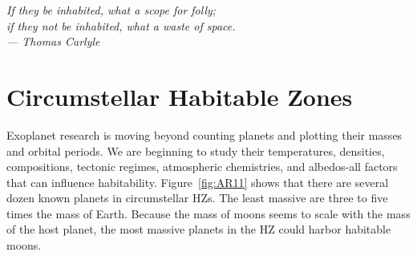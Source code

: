 \clearpage

\begin{flushright}
	\textit{If they be inhabited, what a scope for folly;\\if they not be inhabited, what a waste of space.\\
		--- Thomas Carlyle}
\end{flushright}

\section{Circumstellar Habitable Zones}\label{sec:HabitableTemperatures}
Exoplanet research is moving beyond counting planets and plotting their masses and orbital periods. We are beginning to study their temperatures, densities, compositions, tectonic regimes, atmospheric chemistries, and albedos-all factors that can influence habitability. Figure~\ref{fig:AR11} shows that there are several dozen known planets in circumstellar HZs. The least massive are three to five times the mass of Earth. Because the mass of moons seems to scale with the mass of the host planet, the most massive planets in the HZ could harbor habitable moons.


